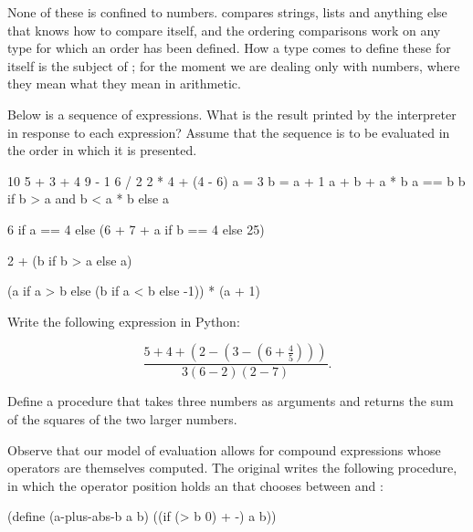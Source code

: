None of these is confined to numbers.  \code{==} compares strings, lists and
anything else that knows how to compare itself, and the ordering comparisons
work on any type for which an order has been defined.  How a type comes to
define these for itself is the subject of ; for the moment we
are dealing only with numbers, where they mean what they mean in arithmetic.

\begin{exerciseGroup}
\label{Exercise 1.1}
 Below is a sequence of expressions.
What is the result printed by the interpreter in response to each expression?
Assume that the sequence is to be evaluated in the order in which it is
presented.

\begin{codeBlock}
10
5 + 3 + 4
9 - 1
6 / 2
2 * 4 + (4 - 6)
a = 3
b = a + 1
a + b + a * b
a == b
b if b > a and b < a * b else a
\end{codeBlock}

\begin{codeBlock}
6 if a == 4 else (6 + 7 + a if b == 4 else 25)
\end{codeBlock}

\begin{codeBlock}
2 + (b if b > a else a)
\end{codeBlock}

\begin{codeBlock}
(a if a > b else (b if a < b else -1)) * (a + 1)
\end{codeBlock}

\label{Exercise 1.2}
 Write the following expression in
Python:

$$\frac{5 + 4 + (2 - (3 - (6 + \frac{4}{5})))}{3(6 - 2)(2 - 7)}.$$


\label{Exercise 1.3}
 Define a procedure that takes three
numbers as arguments and returns the sum of the squares of the two larger
numbers.

\label{Exercise 1.4}
 Observe that our model of
evaluation allows for compound expressions whose operators are themselves
computed.  The original writes the following procedure, in which the operator
position holds an  that chooses between \code{+} and \code{-}:

\begin{syntaxForm}
(define (a-plus-abs-b a b)
  ((if (> b 0) + -) a b))
\end{syntaxForm}


\end{exerciseGroup}
